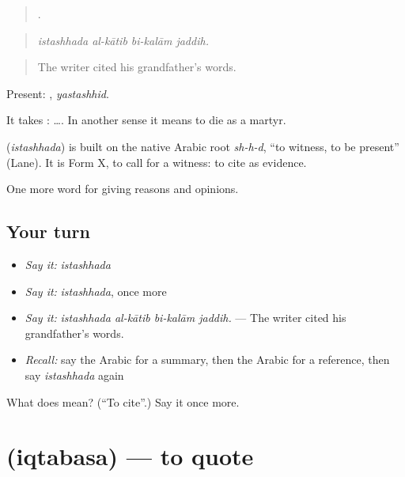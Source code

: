 \begin{quote}
   .
\end{quote}

\begin{quote}
\emph{istashhada al-kātib bi-kalām jaddih.}
\end{quote}

\begin{quote}
The writer cited his grandfather's words.
\end{quote}

Present: , \emph{yastashhid}.

It takes :   …. In another sense it means to die as a martyr.

\begin{cousinweb}
\textbf{} (\emph{istashhada}) is built on the native Arabic root \emph{sh-h-d}, \textquotedblleft{}to witness, to be present\textquotedblright{} (Lane). It is Form X, to call for a witness: to cite as evidence.
\end{cousinweb}

\begin{grammarlens}[title={What you've built}]
One more word for giving reasons and opinions.
\end{grammarlens}

\subsection*{Your turn}
\begin{itemize}
\raggedright
  \item \emph{Say it:} \emph{istashhada}
  \item \emph{Say it:} \emph{istashhada}, once more
  \item \emph{Say it:} \emph{istashhada al-kātib bi-kalām jaddih.} — The writer cited his grandfather's words.
  \item \emph{Recall:} say the Arabic for a summary, then the Arabic for a reference, then say \emph{istashhada} again
\end{itemize}

\begin{tcolorbox}[breakable,colback=teal!4,colframe=teal!35!black,title={Before you move on}]
What does  mean? (\textquotedblleft{}To cite\textquotedblright{}.) Say it once more.
\end{tcolorbox}
\section[\texorpdfstring{\ar{اقتبس} (iqtabasa)}{اقتبس (iqtabasa)}]{ (iqtabasa) — to quote}

